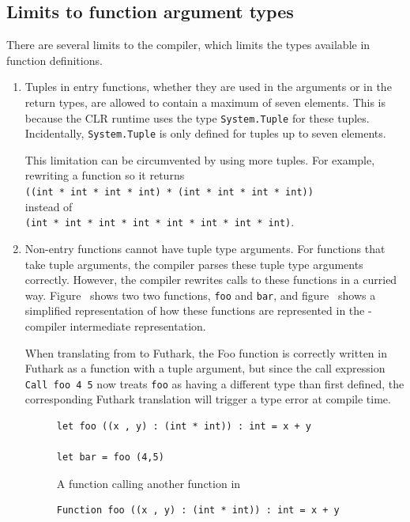 \subsection{Limits to function argument types}
\label{noteonfsharktypes}
There are several limits to the \fsharp{} compiler, which limits the types
available in function definitions.\\
\begin{enumerate}
\item Tuples in entry functions, whether they are used in the arguments or in the
return types, are allowed to contain a maximum of seven elements. This is
because the CLR runtime uses the type \texttt{System.Tuple} for these tuples.
Incidentally, \texttt{System.Tuple} is only defined for tuples up to seven
elements.

This limitation can be circumvented by using more tuples. For example, rewriting
a function so it returns \\
\texttt{((int * int * int * int) * (int * int * int * int))}\\
instead of\\
\texttt{(int * int * int * int * int * int * int * int)}.

\item Non-entry functions cannot have tuple type arguments.
  For functions that take tuple arguments, the \fsharp{} compiler parses these
  tuple type arguments correctly.
  However, the \fsharp{} compiler rewrites calls to these functions in a curried
  way. Figure~ shows two two \fsharp{} functions, {\tt foo}
    and {\tt bar}, and figure~ shows a simplified 
    representation of how these functions are represented in the
    \fsharp{}-compiler intermediate representation.

  When translating from \fshark{} to Futhark, the Foo function is correctly
  written in Futhark as a function with a tuple argument, but since the call
  expression {\tt Call foo 4 5} now treats \texttt{foo} as having a different 
  type than first defined, the corresponding Futhark translation will trigger 
  a type error at compile time.

\begin{figure}[H]
\centering
\begin{verbatim}
let foo ((x , y) : (int * int)) : int = x + y

let bar = foo (4,5)
\end{verbatim}
\caption{A function calling another function in \fsharp{}}
    \label{fig:astcurried}
    \end{figure}
\begin{figure}[H]
\begin{verbatim}
Function foo ((x , y) : (int * int)) : int = x + y


\end{verbatim}
\end{figure}
\end{enumerate}
